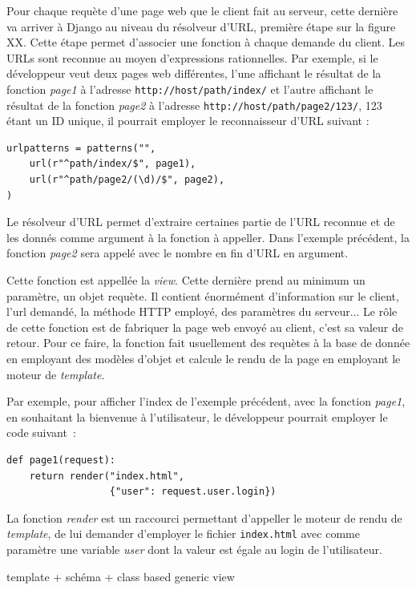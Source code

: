 \documentclass[a4paper,12pt]{article}
\begin{document}
Pour chaque requète d'une page web que le client fait au serveur, cette dernière
va arriver à Django au niveau du résolveur d'URL, première étape sur la figure XX.
Cette étape permet d'associer une fonction
à chaque demande du client. Les URLs sont reconnue au moyen d'expressions rationnelles.
Par exemple, si le développeur veut deux pages web différentes, l'une affichant
le résultat de la fonction \textit{page1} à l'adresse \texttt{http://host/path/index/} et
l'autre affichant le résultat de la fonction \textit{page2} à l'adresse
\texttt{http://host/path/page2/123/}, 123 étant un ID unique, il pourrait employer
le reconnaisseur d'URL suivant :

\begin{verbatim}
urlpatterns = patterns("",
    url(r"^path/index/$", page1),
    url(r"^path/page2/(\d)/$", page2),
)
\end{verbatim}

Le résolveur d'URL permet d'extraire certaines partie de l'URL reconnue et de les donnés
comme argument à la fonction à appeller. Dans l'exemple précédent, la fonction \textit{page2}
sera appelé avec le nombre en fin d'URL en argument.

Cette fonction est appellée la \textit{view}. Cette dernière prend au minimum un paramètre,
un objet requète. Il contient énormément d'information sur le client, l'url demandé,
la méthode HTTP employé, des paramètres du serveur... Le rôle de cette fonction
est de fabriquer la page web envoyé au client, c'est sa valeur de retour. Pour ce faire,
la fonction fait usuellement des requètes à la base de donnée en employant des modèles
d'objet et calcule le rendu de la page en employant le moteur de \textit{template}.

Par exemple, pour afficher l'index de l'exemple précédent, avec la fonction \textit{page1},
en souhaitant la bienvenue à l'utilisateur, le développeur pourrait employer le code
suivant~:

\begin{verbatim}
def page1(request):
    return render("index.html",
                  {"user": request.user.login})
\end{verbatim}

La fonction \textit{render} est un raccourci permettant d'appeller le moteur
de rendu de \textit{template}, de lui demander d'employer le fichier \texttt{index.html}
avec comme paramètre une variable \textit{user} dont la valeur est égale
au login de l'utilisateur.


template + schéma + class based generic view
\end{document}
